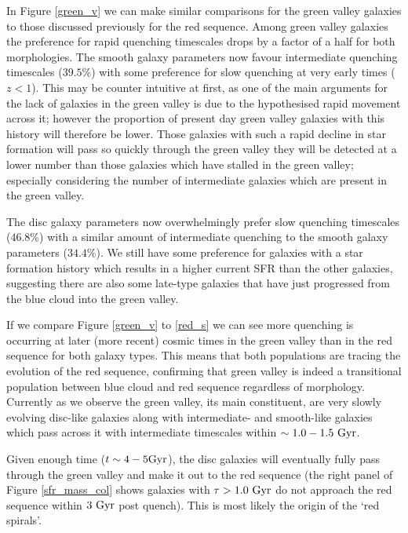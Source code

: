 \documentclass[useAMS,usenatbib]{mn2e}
\def\changed    {\color{titlecol} }
\begin{document}
In Figure \ref{green_v} we can make similar comparisons for the green valley galaxies to those discussed previously for the red sequence. {\changed Among green valley galaxies the preference for rapid quenching timescales drops by a factor of a half for both morphologies. The smooth galaxy parameters now favour intermediate quenching timescales ($39.5\%$) with some preference for slow quenching at very early times ($z < 1$).} This may be counter intuitive at first, as one of the main arguments for the lack of galaxies in the green valley is due to the hypothesised rapid movement across it; however the proportion of present day green valley galaxies with this history will therefore be lower. {\changed Those galaxies with such a rapid decline in star formation will pass so quickly through the green valley they will be detected at a lower number than those galaxies which have stalled in the green valley;} especially considering the number of intermediate galaxies which are present in the green valley.

{\changed The disc galaxy parameters now overwhelmingly prefer slow quenching timescales ($46.8\%$) with a similar amount of intermediate quenching to the smooth galaxy parameters ($34.4\%$).} We still have some preference for galaxies with a star formation history which results in a higher current SFR than the other galaxies, suggesting there are also some late-type galaxies that have just progressed from the blue cloud into the green valley. 

{\changed If we compare Figure \ref{green_v} to \ref{red_s} we can see more quenching is occurring at later (more recent) cosmic times in the green valley than in the red sequence for both galaxy types.} This means that both populations are tracing the evolution of the red sequence, confirming that green valley is indeed a transitional population between blue cloud and red sequence regardless of morphology. Currently as we observe the green valley, its main constituent, are very slowly evolving disc-like galaxies along with intermediate- and smooth-like galaxies which pass across it with intermediate timescales within $\sim 1.0-1.5~\rm{Gyr}$.

Given enough time ($t\sim4-5\rm{Gyr}$), the disc galaxies will eventually fully pass through the green valley and make it out to the red sequence (the right panel of Figure \ref{sfr_mass_col} shows galaxies with $\tau > 1.0~\rm{Gyr}$ do not approach the red sequence within $3~\rm{Gyr}$ post quench). This is most likely the origin of the `red spirals'.
\end{document}

